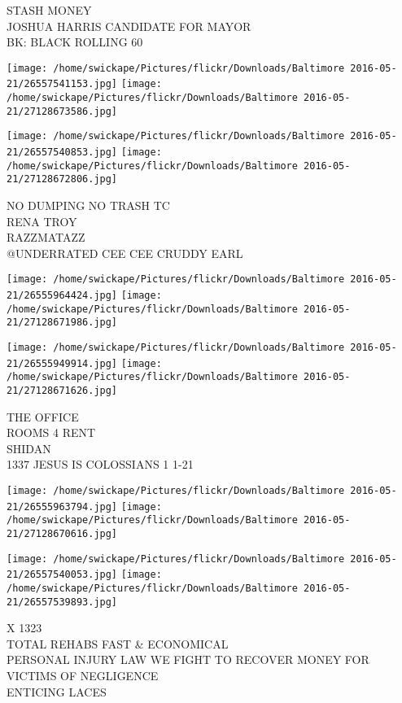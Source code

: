 \documentclass[10pt,letterpaper]{article}
\begin{document}
STASH MONEY\\
JOSHUA HARRIS CANDIDATE FOR MAYOR\\
BK: BLACK ROLLING 60\\
\pagebreak

\texttt{[image: /home/swickape/Pictures/flickr/Downloads/Baltimore 2016-05-21/26557541153.jpg]}
\texttt{[image: /home/swickape/Pictures/flickr/Downloads/Baltimore 2016-05-21/27128673586.jpg]}

\texttt{[image: /home/swickape/Pictures/flickr/Downloads/Baltimore 2016-05-21/26557540853.jpg]}
\texttt{[image: /home/swickape/Pictures/flickr/Downloads/Baltimore 2016-05-21/27128672806.jpg]}

NO DUMPING NO TRASH TC\\
RENA TROY\\
RAZZMATAZZ\\
@UNDERRATED CEE CEE CRUDDY EARL\\
\pagebreak

\texttt{[image: /home/swickape/Pictures/flickr/Downloads/Baltimore 2016-05-21/26555964424.jpg]}
\texttt{[image: /home/swickape/Pictures/flickr/Downloads/Baltimore 2016-05-21/27128671986.jpg]}

\texttt{[image: /home/swickape/Pictures/flickr/Downloads/Baltimore 2016-05-21/26555949914.jpg]}
\texttt{[image: /home/swickape/Pictures/flickr/Downloads/Baltimore 2016-05-21/27128671626.jpg]}

THE OFFICE\\
ROOMS 4 RENT\\
SHIDAN\\
1337 JESUS IS COLOSSIANS 1 1{-}21\\
\pagebreak

\texttt{[image: /home/swickape/Pictures/flickr/Downloads/Baltimore 2016-05-21/26555963794.jpg]}
\texttt{[image: /home/swickape/Pictures/flickr/Downloads/Baltimore 2016-05-21/27128670616.jpg]}

\texttt{[image: /home/swickape/Pictures/flickr/Downloads/Baltimore 2016-05-21/26557540053.jpg]}
\texttt{[image: /home/swickape/Pictures/flickr/Downloads/Baltimore 2016-05-21/26557539893.jpg]}

X 1323\\
TOTAL REHABS FAST \& ECONOMICAL\\
PERSONAL INJURY LAW WE FIGHT TO RECOVER MONEY FOR VICTIMS OF NEGLIGENCE\\
ENTICING LACES\\
\pagebreak
\end{document}
